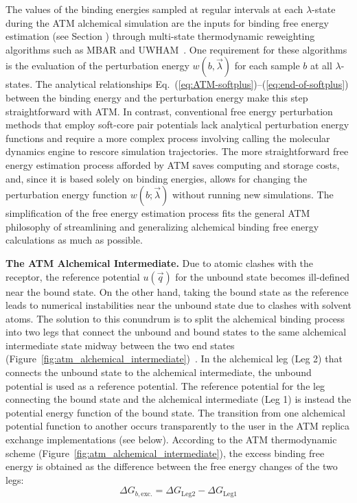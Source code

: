 \documentclass[9pt,bestpractices]{livecoms}
\begin{document}
The values of the binding energies sampled at regular intervals at each $\lambda$-state during the ATM alchemical simulation are the inputs for binding free energy estimation (see Section \label{sec:data_analysis}) through multi-state thermodynamic reweighting algorithms such as MBAR and UWHAM~\cite{shirts2008statistically,Tan2012}. One requirement for these algorithms is the evaluation of the perturbation energy $w(b,\vec{\lambda})$ for each sample $b$ at all $\lambda$-states.  The analytical relationships Eq.~(\ref{eq:ATM-softplus})--(\ref{eq:end-of-softplus}) between the binding energy and the perturbation energy make this step straightforward with ATM. In contrast, conventional free energy perturbation methods that employ soft-core pair potentials lack analytical perturbation energy functions and require a more complex process involving calling the molecular dynamics engine to rescore simulation trajectories. The more straightforward free energy estimation process afforded by ATM saves computing and storage costs, and, since it is based solely on binding energies, allows for changing the perturbation energy function $w(b;\vec{\lambda})$ without running new simulations. The simplification of the free energy estimation process fits the general ATM philosophy of streamlining and generalizing alchemical binding free energy calculations as much as possible.

{\bf The ATM Alchemical Intermediate.} Due to atomic clashes with the receptor, the reference potential $u(\vec{q})$ for the unbound state becomes ill-defined near the bound state. On the other hand, taking the bound state as the reference leads to numerical instabilities near the unbound state due to clashes with solvent atoms. The solution to this conundrum is to split the alchemical binding process into two legs that connect the unbound and bound states to the same alchemical intermediate state midway between the two end states (Figure~\ref{fig:atm_alchemical_intermediate})~\cite{wu2021alchemical,azimi2022relative}. In the alchemical leg (Leg 2) that connects the unbound state to the alchemical intermediate, the unbound potential is used as a reference potential. The reference potential for the leg connecting the bound state and the alchemical intermediate (Leg 1) is instead the potential energy function of the bound state. The transition from one alchemical potential function to another occurs transparently to the user in the ATM replica exchange implementations (see below). According to the ATM thermodynamic scheme (Figure~\ref{fig:atm_alchemical_intermediate}), the excess binding free energy is obtained as the difference between the free energy changes of the two legs:
\begin{equation}
\Delta G_{b, \text{exc.}} = \Delta G_{\text{Leg2}} - \Delta G_{\text{Leg1}}
\end{equation}
\end{document}
